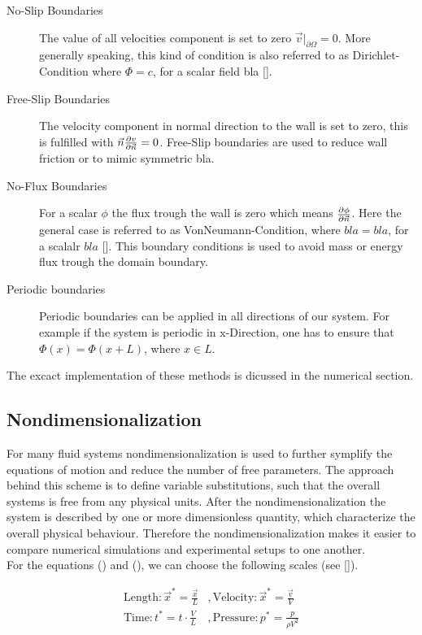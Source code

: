 \begin{description}
    \item[No-Slip Boundaries] The value of all velocities component is set to zero $\vec{v}|_{\partial \Omega} = 0$.
                              More generally speaking, this kind of condition is  also referred to as Dirichlet-Condition where $\Phi=c $, for a scalar field bla [].
    \item[Free-Slip Boundaries] The velocity component in normal direction to the wall is set to zero, this is fulfilled with $\vec{n}\pdn[v]{\vec{n}} = 0$.
                                Free-Slip boundaries are used to reduce wall friction or to mimic symmetric bla.
    \item[No-Flux Boundaries] For a scalar $\phi$ the flux trough the wall is zero which means $\pdn[\phi]{\vec{n}}$.
                              Here the general case is referred to as VonNeumann-Condition, where $bla=bla$, for a scalalr $bla$  [].
                              This boundary conditions is used to avoid mass or energy flux trough the domain boundary.
    \item[Periodic boundaries] Periodic boundaries can be applied in all directions of our system. For example if the system is periodic in x-Direction,
                                one has to ensure that $\Phi(x) = \Phi(x + L)$, where $x \in L$.

\end{description}

The excact implementation of these methods is dicussed in the numerical section.

\subsection{Nondimensionalization}

For many fluid systems nondimensionalization is used to further symplify the equations of motion and reduce the number of free parameters.
The approach behind this scheme is to define variable substitutions, such that the overall systems is free from any physical units.
After the nondimensionalization the system is described by one or more dimensionless quantity, which characterize the overall physical behaviour.
Therefore the nondimensionalization makes it easier to compare numerical simulations and experimental setups to one another.\\
For the equations () and (), we can choose the following scales (see []).

\begin{align}
    \mathrm{Length}  : \vec{x}^* = \frac{\vec{x}}{L}  &, \mathrm{Velocity}: \vec{x}^* = \frac{\vec{v}}{V}\\
    \mathrm{Time}    : t^* = t \cdot \frac{V}{L}      &, \mathrm{Pressure}: p^* = \frac{p}{\rho V^2}
\end{align}


